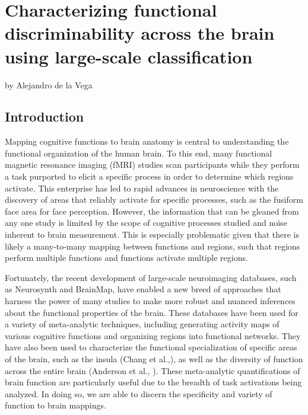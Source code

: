 \def\format{complete}
\part{Characterizing functional discriminability across the brain using large-scale classification}
\label{characterizingfunctionaldiscriminabilityacrossthebrainusinglarge-scaleclassification}

by Alejandro de la Vega

\chapter{Introduction}
\label{introduction}

Mapping cognitive functions to brain anatomy is central to understanding the functional organization of the human brain. To this end, many functional magnetic resonance imaging (fMRI) studies scan participants while they perform a task purported to elicit a specific process in order to determine which regions activate. This enterprise has led to rapid advances in neuroscience with the discovery of areas that reliably activate for specific processes, such as the fusiform face area for face perception. However, the information that can be gleaned from any one study is limited by the scope of cognitive processes studied and noise inherent to brain measurement. This is especially problematic given that there is likely a many-to-many mapping between functions and regions, such that regions perform multiple functions and functions activate multiple regions. 

Fortunately, the recent development of large-scale neuroimaging databases, such as Neurosynth and BrainMap, have enabled a new breed of approaches that harness the power of many studies to make more robust and nuanced inferences about the functional properties of the brain. These databases have been used for a variety of meta-analytic techniques, including generating activity maps of various cognitive functions and organizing regions into functional networks. They have also been used to characterize the functional specialization of specific areas of the brain, such as the insula (Chang et al.,), as well as the diversity of function across the entire brain (Anderson et al., ). These meta-analytic quantifications of brain function are particularly useful due to the breadth of task activations being analyzed. In doing so, we are able to discern the specificity and variety of function to brain mappings. 

